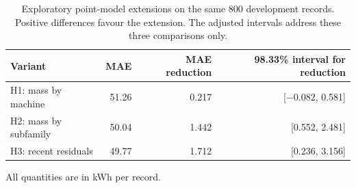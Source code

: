 \begin{table}[!htbp]\centering\small
\caption{Exploratory point-model extensions on the same 800 development records. Positive differences favour the extension. The adjusted intervals address these three comparisons only.}\label{tab:explore}
\begin{tabular}{@{}lrrr@{}}\toprule
Variant & MAE & MAE reduction & 98.33\% interval for reduction\\\midrule
H1: mass by machine & 51.26 & 0.217 & [$-0.082$, 0.581]\\
H2: mass by subfamily & 50.04 & 1.442 & [0.552, 2.481]\\
H3: recent residuals & 49.77 & 1.712 & [0.236, 3.156]\\\bottomrule
\end{tabular}\par\vspace{4pt}\footnotesize All quantities are in kWh per record.
\end{table}
